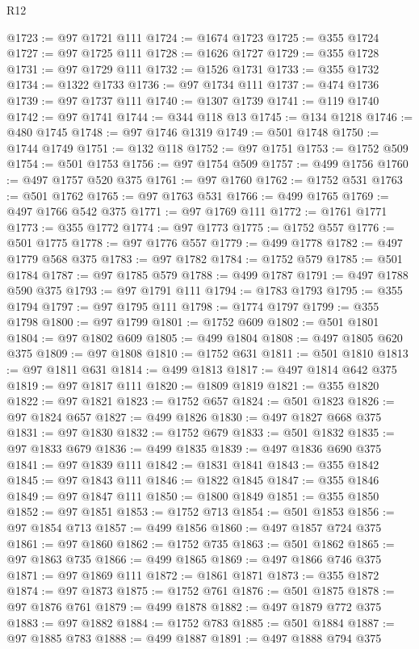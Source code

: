\begin{lexlean}{R12}
\begin{coremodule}
{{{{{{{{{{{{{{{{{{{{{{{{{{{{{{{{{{{{{{{{{{{{{{{{{{{{{{{{{{{{{{{{{{{{{{{{{{{{{{{{{{@1723 := @97 @1721 @111
@1724 := @1674 @1723
@1725 := @355 @1724
@1727 := @97 @1725 @111
@1728 := @1626 @1727
@1729 := @355 @1728
@1731 := @97 @1729 @111
@1732 := @1526 @1731
@1733 := @355 @1732
@1734 := @1322 @1733
@1736 := @97 @1734 @111
@1737 := @474 @1736
@1739 := @97 @1737 @111
@1740 := @1307 @1739
@1741 := @119 @1740
@1742 := @97 @1741
@1744 := @344 @118 @13
@1745 := @134 @1218
@1746 := @480 @1745
@1748 := @97 @1746 @1319
@1749 := @501 @1748
@1750 := @1744 @1749
@1751 := @132 @118
@1752 := @97 @1751
@1753 := @1752 @509
@1754 := @501 @1753
@1756 := @97 @1754 @509
@1757 := @499 @1756
@1760 := @497 @1757 @520 @375
@1761 := @97 @1760
@1762 := @1752 @531
@1763 := @501 @1762
@1765 := @97 @1763 @531
@1766 := @499 @1765
@1769 := @497 @1766 @542 @375
@1771 := @97 @1769 @111
@1772 := @1761 @1771
@1773 := @355 @1772
@1774 := @97 @1773
@1775 := @1752 @557
@1776 := @501 @1775
@1778 := @97 @1776 @557
@1779 := @499 @1778
@1782 := @497 @1779 @568 @375
@1783 := @97 @1782
@1784 := @1752 @579
@1785 := @501 @1784
@1787 := @97 @1785 @579
@1788 := @499 @1787
@1791 := @497 @1788 @590 @375
@1793 := @97 @1791 @111
@1794 := @1783 @1793
@1795 := @355 @1794
@1797 := @97 @1795 @111
@1798 := @1774 @1797
@1799 := @355 @1798
@1800 := @97 @1799
@1801 := @1752 @609
@1802 := @501 @1801
@1804 := @97 @1802 @609
@1805 := @499 @1804
@1808 := @497 @1805 @620 @375
@1809 := @97 @1808
@1810 := @1752 @631
@1811 := @501 @1810
@1813 := @97 @1811 @631
@1814 := @499 @1813
@1817 := @497 @1814 @642 @375
@1819 := @97 @1817 @111
@1820 := @1809 @1819
@1821 := @355 @1820
@1822 := @97 @1821
@1823 := @1752 @657
@1824 := @501 @1823
@1826 := @97 @1824 @657
@1827 := @499 @1826
@1830 := @497 @1827 @668 @375
@1831 := @97 @1830
@1832 := @1752 @679
@1833 := @501 @1832
@1835 := @97 @1833 @679
@1836 := @499 @1835
@1839 := @497 @1836 @690 @375
@1841 := @97 @1839 @111
@1842 := @1831 @1841
@1843 := @355 @1842
@1845 := @97 @1843 @111
@1846 := @1822 @1845
@1847 := @355 @1846
@1849 := @97 @1847 @111
@1850 := @1800 @1849
@1851 := @355 @1850
@1852 := @97 @1851
@1853 := @1752 @713
@1854 := @501 @1853
@1856 := @97 @1854 @713
@1857 := @499 @1856
@1860 := @497 @1857 @724 @375
@1861 := @97 @1860
@1862 := @1752 @735
@1863 := @501 @1862
@1865 := @97 @1863 @735
@1866 := @499 @1865
@1869 := @497 @1866 @746 @375
@1871 := @97 @1869 @111
@1872 := @1861 @1871
@1873 := @355 @1872
@1874 := @97 @1873
@1875 := @1752 @761
@1876 := @501 @1875
@1878 := @97 @1876 @761
@1879 := @499 @1878
@1882 := @497 @1879 @772 @375
@1883 := @97 @1882
@1884 := @1752 @783
@1885 := @501 @1884
@1887 := @97 @1885 @783
@1888 := @499 @1887
@1891 := @497 @1888 @794 @375
}}}}}}}}}}}}}}}}}}}}}}}}}}}}}}}}}}}}}}}}}}}}}}}}}}}}}}}}}}}}}}}}}}}}}}}}}}}}}}}}}}
\end{coremodule}
\end{lexlean}
